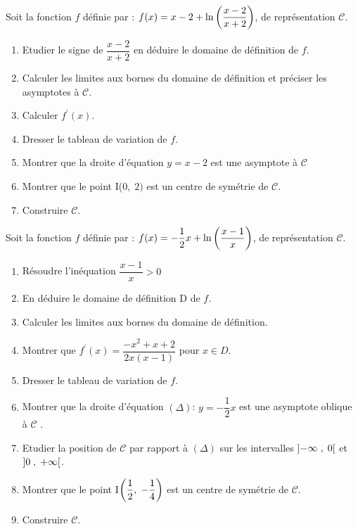   \begin{exercice}

 Soit la fonction $ f $ définie par : $ f(x)=x-2+\ln\left(\dfrac{x-2}{x+2}\right)  $, de  représentation $ \mathscr{C} $.
 \begin{enumerate}
 \item Etudier le signe de    $ \dfrac{x-2}{x+2} $ en déduire le domaine de définition de $ f $. 
 \item Calculer les limites aux bornes du domaine de définition et préciser les asymptotes à $ \mathscr{C} $.
 \item Calculer  $ f^{\prime}(x) $.
  \item Dresser le tableau de variation de $ f. $
  \item Montrer que la droite d'équation $ y=x-2 $  est une asymptote à $ \mathscr{C} $ 
  \item Montrer que le point I($ 0,\; 2) $  est un centre de symétrie de $ \mathscr{C} $.
  \item Construire $ \mathscr{C} $.
 \end{enumerate}
  \end{exercice}
  
  \begin{exercice}

 Soit la fonction $ f $ définie par : $ f(x)=-\dfrac{1}{2}x+\ln\left(\dfrac{x-1}{x}\right)  $, de  représentation $ \mathscr{C} $.
 \begin{enumerate}
 \item Résoudre l'inéquation   $ \dfrac{x-1}{x}>0 $ 
 \item En déduire le domaine de définition  D de $ f $. 
 \item Calculer les limites aux bornes du domaine de définition.
 \item Montrer que   $ f^{\prime}(x) =\dfrac{-x^{2}+x+2}{2x(x-1)}$  pour $ x\in D $.
  \item Dresser le tableau de variation de $ f. $
  \item Montrer que la droite d'équation $ (\Delta) $:\;  $ y=-\dfrac{1}{2}x $  est une asymptote oblique  à $ \mathscr{C} $ .
  \item Etudier la position de $ \mathscr{C} $   par rapport à $ (\Delta) $ sur les intervalles $\left]-\infty \;,\; 0\right[ $ et $\left]0 \;,\; +\infty\right[ $.
  \item Montrer que le point I$\left( \dfrac{1}{2},\; -\dfrac{1}{4}\right) $  est un centre de symétrie de $ \mathscr{C} $.
  \item Construire $ \mathscr{C} $.
 \end{enumerate}
  \end{exercice}
  
